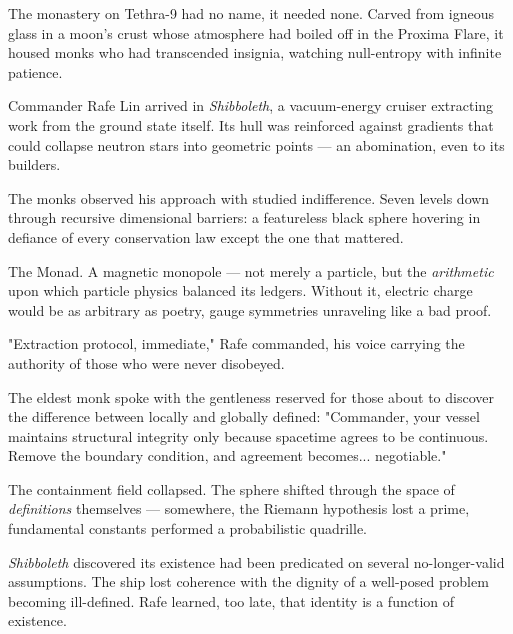 \begin{tcolorbox}[colback=gray!5,colframe=gray!40,boxrule=0.5pt,arc=3pt,boxsep=10pt,left=8pt,right=8pt,top=8pt,bottom=8pt]

The monastery on Tethra-9 had no name, it needed none. Carved from igneous glass in a moon's crust whose atmosphere had boiled off in the Proxima Flare, it housed monks who had transcended insignia, watching null-entropy with infinite patience.

\medskip

Commander Rafe Lin arrived in \emph{Shibboleth}, a vacuum-energy cruiser extracting work from the ground state itself. Its hull was reinforced against gradients that could collapse neutron stars into geometric points — an abomination, even to its builders.

\medskip

The monks observed his approach with studied indifference. Seven levels down through recursive dimensional barriers: a featureless black sphere hovering in defiance of every conservation law except the one that mattered.

\medskip

The Monad. A magnetic monopole — not merely a particle, but the \emph{arithmetic} upon which particle physics balanced its ledgers. Without it, electric charge would be as arbitrary as poetry, gauge symmetries unraveling like a bad proof.

\medskip

"Extraction protocol, immediate," Rafe commanded, his voice carrying the authority of those who were never disobeyed.

\medskip

The eldest monk spoke with the gentleness reserved for those about to discover the difference between locally and globally defined: "Commander, your vessel maintains structural integrity only because spacetime agrees to be continuous. Remove the boundary condition, and agreement becomes... negotiable."

\medskip

The containment field collapsed. The sphere shifted through the space of \emph{definitions} themselves — somewhere, the Riemann hypothesis lost a prime, fundamental constants performed a probabilistic quadrille.

\medskip

\emph{Shibboleth} discovered its existence had been predicated on several no-longer-valid assumptions. The ship lost coherence with the dignity of a well-posed problem becoming ill-defined. Rafe learned, too late, that identity is a function of existence.



\end{tcolorbox}
